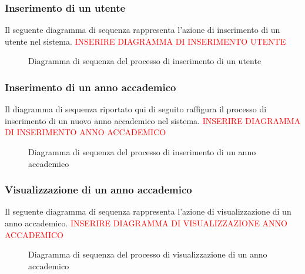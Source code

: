 		\subsubsection{Inserimento di un utente}
		Il seguente diagramma di sequenza rappresenta l'azione di inserimento di un utente nel sistema.
		{\textcolor{red}{INSERIRE DIAGRAMMA DI INSERIMENTO UTENTE}}
		\begin{figure}[h]
			\centering
			\caption{Diagramma di sequenza del processo di inserimento di un utente}
			\label{}
		\end{figure}
		
		\subsubsection{Inserimento di un anno accademico}
		Il diagramma di sequenza riportato qui di seguito raffigura il processo di inserimento di un nuovo anno accademico nel sistema.
		{\textcolor{red}{INSERIRE DIAGRAMMA DI INSERIMENTO ANNO ACCADEMICO}}
		\begin{figure}[h]
			\centering
			\caption{Diagramma di sequenza del processo di inserimento di un anno accademico}
			\label{}
		\end{figure}
		
		\subsubsection{Visualizzazione di un anno accademico}
		Il seguente diagramma di sequenza rappresenta l'azione di visualizzazione di un anno accademico.
		{\textcolor{red}{INSERIRE DIAGRAMMA DI VISUALIZZAZIONE ANNO ACCADEMICO}}
		\begin{figure}[h]
			\centering
			\caption{Diagramma di sequenza del processo di visualizzazione di un anno accademico}
			\label{}
		\end{figure}
	
	
	
	
	